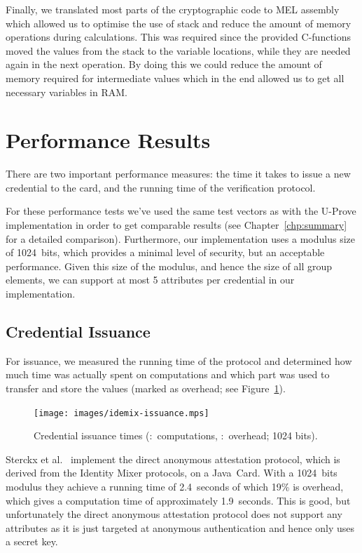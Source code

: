 Finally, we translated most parts of the cryptographic code to MEL assembly
which allowed us to optimise the use of stack and reduce the amount of memory
operations during calculations. This was required since the provided C-functions
moved the values from the stack to the variable locations, while they are needed
again in the next operation. By doing this we could reduce the amount of memory
required for intermediate values which in the end allowed us to get all
necessary variables in RAM.

\section{Performance Results\label{sec:IM-performance}}

There are two important performance measures: the time it takes to issue a new
credential to the card, and the running time of the verification protocol.

For these performance tests we've used the same test vectors as with the U-Prove
implementation in order to get comparable results (see
Chapter~\ref{chp:summary} for a detailed comparison). Furthermore, our
implementation uses a modulus size of 1024~bits, which provides a minimal level
of security, but an acceptable performance. Given this size of the modulus, and
hence the size of all group elements, we can support at most 5 attributes per
credential in our implementation.

\subsection{Credential Issuance}

For issuance, we measured the running time of the protocol and determined how
much time was actually spent on computations and which part was used to transfer
and store the values (marked as overhead; see Figure~\ref{fig:issuance}).

\begin{figure}[b]
  \centering
  \texttt{[image: images/idemix-issuance.mps]}

  \caption[Credential issuance times.]{
    Credential issuance times
    (:~computations,
      :~overhead; 1024 bits).}
  \label{fig:issuance}
\end{figure}

Sterckx et al.~\cite{Sterckx09} implement the direct anonymous attestation
protocol, which is derived from the Identity Mixer protocols, on a Java~Card.
With a 1024~bits modulus they achieve a running time of 2.4~seconds of which
19\% is overhead, which gives a computation time of approximately 1.9~seconds.
This is good, but unfortunately the direct anonymous attestation protocol does
not support any attributes as it is just targeted at anonymous authentication
and hence only uses a secret key.

